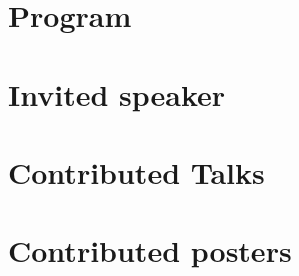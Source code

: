 \documentclass[12pt, a4paper]{scrbook}
\begin{document}
\chapter{Program}

\begin{center}
  
\end{center}

\chapter{Invited speaker}



\chapter{Contributed Talks}



\chapter{Contributed posters}


\end{document}
